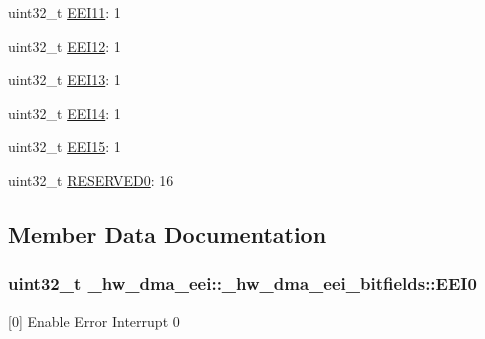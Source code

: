 \begin{DoxyCompactItemize}
\item 
uint32\+\_\+t \hyperlink{struct__hw__dma__eei_1_1__hw__dma__eei__bitfields_acdbe0b8633dabbcac3c3295725ff128f}{E\+E\+I11}\+: 1
\item 
uint32\+\_\+t \hyperlink{struct__hw__dma__eei_1_1__hw__dma__eei__bitfields_a205204753327454b7e1334b602b5072e}{E\+E\+I12}\+: 1
\item 
uint32\+\_\+t \hyperlink{struct__hw__dma__eei_1_1__hw__dma__eei__bitfields_a96ddb8c5dcef4d994db6a873ac4830cb}{E\+E\+I13}\+: 1
\item 
uint32\+\_\+t \hyperlink{struct__hw__dma__eei_1_1__hw__dma__eei__bitfields_a409bd3cd8360b154aae628e308a0d712}{E\+E\+I14}\+: 1
\item 
uint32\+\_\+t \hyperlink{struct__hw__dma__eei_1_1__hw__dma__eei__bitfields_a58962b678b6c47ebcdcf27e752407d55}{E\+E\+I15}\+: 1
\item 
uint32\+\_\+t \hyperlink{struct__hw__dma__eei_1_1__hw__dma__eei__bitfields_a2859369916f2db8fbcdf1c9890a134eb}{R\+E\+S\+E\+R\+V\+E\+D0}\+: 16
\end{DoxyCompactItemize}


\subsection{Member Data Documentation}
\subsubsection[{\texorpdfstring{E\+E\+I0}{EEI0}}]{\setlength{\rightskip}{0pt plus 5cm}uint32\+\_\+t \+\_\+hw\+\_\+dma\+\_\+eei\+::\+\_\+hw\+\_\+dma\+\_\+eei\+\_\+bitfields\+::\+E\+E\+I0}\hypertarget{struct__hw__dma__eei_1_1__hw__dma__eei__bitfields_a9f7024f915c3e22df5d9606c1d901620}{}\label{struct__hw__dma__eei_1_1__hw__dma__eei__bitfields_a9f7024f915c3e22df5d9606c1d901620}
\mbox{[}0\mbox{]} Enable Error Interrupt 0 
